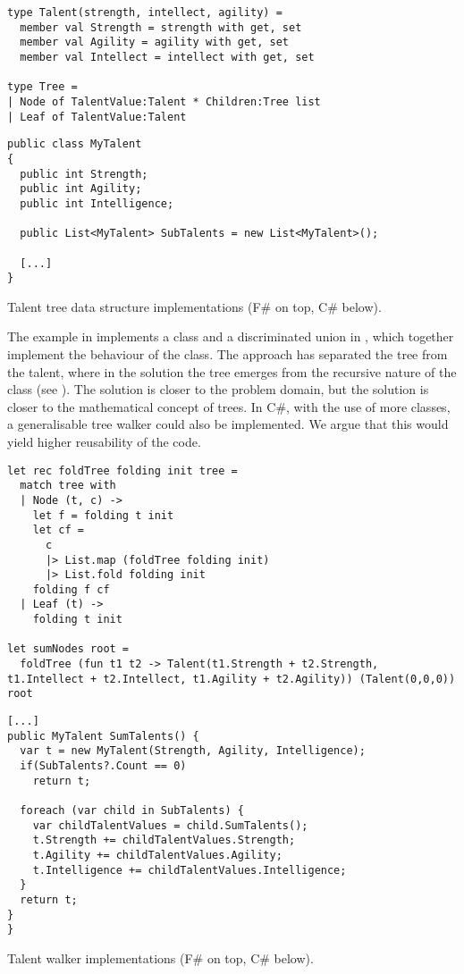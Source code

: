 \begin{listing}[H]
  \begin{verbatim}
type Talent(strength, intellect, agility) =
  member val Strength = strength with get, set
  member val Agility = agility with get, set
  member val Intellect = intellect with get, set

type Tree =
| Node of TalentValue:Talent * Children:Tree list
| Leaf of TalentValue:Talent
  \end{verbatim}
  \begin{verbatim}
public class MyTalent
{
  public int Strength;
  public int Agility;
  public int Intelligence;

  public List<MyTalent> SubTalents = new List<MyTalent>();

  [...]
}
  \end{verbatim}
  \caption{Talent tree data structure implementations (F\# on top, C\# below).}
  \label{lst:tree-data-imps}
\end{listing}

The example in  implements a class and a discriminated union in \fs, which together implement the behaviour of the \cs class. The \fs approach has separated the tree from the talent, where in the  \cs solution the tree emerges from the recursive nature of the class (see ). The \cs solution is closer to the problem domain, but the \fs solution is closer to the mathematical concept of trees. In C\#, with the use of more classes, a generalisable tree walker could also be implemented. We argue that this would yield higher reusability of the code.

\begin{listing}[H]
  \begin{verbatim}
let rec foldTree folding init tree =
  match tree with
  | Node (t, c) ->
    let f = folding t init
    let cf =
      c
      |> List.map (foldTree folding init)
      |> List.fold folding init
    folding f cf
  | Leaf (t) ->
    folding t init

let sumNodes root =
  foldTree (fun t1 t2 -> Talent(t1.Strength + t2.Strength, t1.Intellect + t2.Intellect, t1.Agility + t2.Agility)) (Talent(0,0,0)) root
\end{verbatim}
\begin{verbatim}
[...]
public MyTalent SumTalents() {
  var t = new MyTalent(Strength, Agility, Intelligence);
  if(SubTalents?.Count == 0)
    return t;

  foreach (var child in SubTalents) {
    var childTalentValues = child.SumTalents();
    t.Strength += childTalentValues.Strength;
    t.Agility += childTalentValues.Agility;
    t.Intelligence += childTalentValues.Intelligence;
  }
  return t;
}
}
\end{verbatim}
\caption{Talent walker implementations (F\# on top, C\# below).}
\label{lst:tree-walker-imps}
\end{listing}
